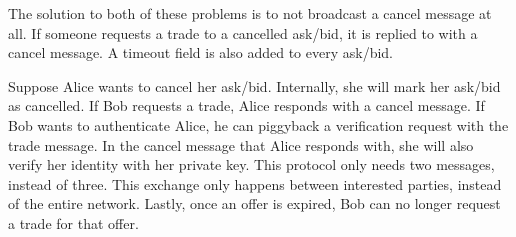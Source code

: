 The solution to both of these problems is to not broadcast a cancel message at all.
If someone requests a trade to a cancelled ask/bid, it is replied to with a cancel message.
A timeout field is also added to every ask/bid.


Suppose Alice wants to cancel her ask/bid.
Internally, she will mark her ask/bid as cancelled.
If Bob requests a trade, Alice responds with a cancel message.
If Bob wants to authenticate Alice, he can piggyback a verification request with the trade message.
In the cancel message that Alice responds with, she will also verify her identity with her private key.
This protocol only needs two messages, instead of three.
This exchange only happens between interested parties, instead of the entire network.
Lastly, once an offer is expired, Bob can no longer request a trade for that offer.
